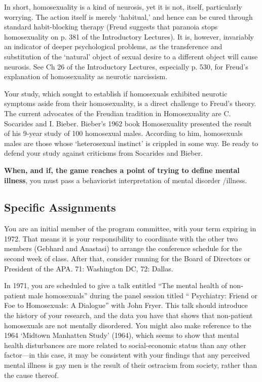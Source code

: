 \begin{refsection}
In short, homosexuality is a kind of neurosis, yet it is not, itself, particularly worrying. The action itself is merely `habitual,' and hence can be cured through standard habit-blocking therapy (Freud suggests that paranoia stops homosexuality on p. 381 of the Introductory Lectures). It is, however, invariably an indicator of deeper psychological problems, as the transference and substitution of the `natural' object of sexual desire to a different object will cause neurosis. See Ch 26 of the Introductory Lectures, especially p. 530, for Freud's explanation of homosexuality as neurotic narcissism.

Your study, which sought to establish if homosexuals exhibited neurotic symptoms aside from their homosexuality, is a direct challenge to Freud's theory. The current advocates of the Freudian tradition in Homosexuality are C. Socarides and I. Bieber. Bieber's 1962 book Homosexuality presented the result of his 9-year study of 100 homosexual males. According to him, homosexuals males are those whose `heterosexual instinct' is crippled in some way. Be ready to defend your study against criticisms from Socarides and Bieber.

\textbf{When, and if, the game reaches a point of trying to define mental illness}, you must pass a behaviorist interpretation of mental disorder \slash  illness.

\subsection{Specific Assignments}
\label{specificassignments}

You are an initial member of the program committee, with your term expiring in 1972. That means it is your responsibility to coordinate with the other two members (Gebhard and Anastasi) to arrange the conference schedule for the second week of class. After that, consider running for the Board of Directors or President of the APA. 71: Washington DC, 72: Dallas.

In 1971, you are scheduled to give a talk entitled ``The mental health of non-patient male homosexuals'' during the panel session titled `` Psychiatry: Friend or Foe to Homosexuals: A Dialogue'' with John Fryer. This talk should introduce the history of your research, and the data you have that shows that non-patient homosexuals are not mentally disordered. You might also make reference to the 1964 `Midtown Manhatten Study' (1964), which seems to show that mental health disturbances are more related to social-economic status than any other factor---in this case, it may be consistent with your findings that any perceived mental illness is gay men is the result of their ostracism from society, rather than the cause thereof. 


\end{refsection}
